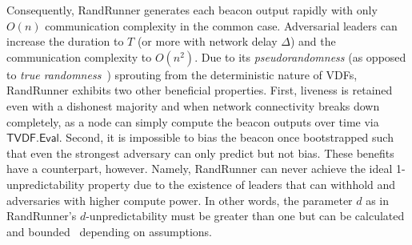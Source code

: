 Consequently, RandRunner generates each beacon output rapidly with only $O(n)$ communication complexity in the common case. Adversarial leaders can increase the \epoch duration to $T$ (or more with network delay $\Delta$) and the communication complexity to $O(n^2)$. Due to its \textit{pseudorandomness} (as opposed to \textit{true randomness}~\cite{cascudomt, das2021spurt}) sprouting from the deterministic nature of VDFs, RandRunner exhibits two other beneficial properties. First, liveness is retained even with a dishonest majority and when network connectivity breaks down completely, as a node can simply compute the beacon outputs over time via $\mathsf{TVDF.Eval}$. Second, it is impossible to bias the beacon once bootstrapped such that even the strongest adversary can only predict but not bias. These benefits have a counterpart, however. Namely, RandRunner can never achieve the ideal 1-unpredictability property due to the existence of leaders that can withhold and adversaries with higher compute power. In other words, the parameter $d$ as in RandRunner's $d$-unpredictability must be greater than one but can be calculated and bounded~\cite{schindler2021randrunner} depending on assumptions.
